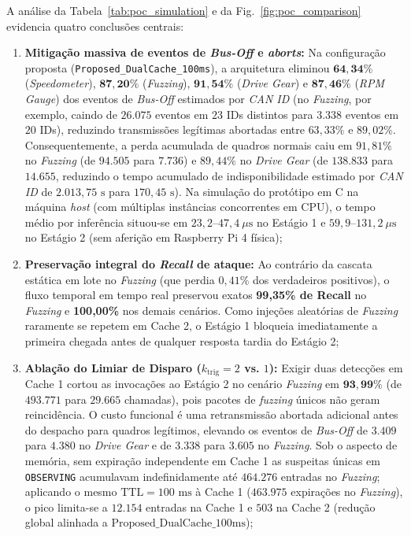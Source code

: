 \documentclass[conference]{IEEEtran}
\begin{document}
A análise da Tabela~\ref{tab:poc_simulation} e da Fig.~\ref{fig:poc_comparison} evidencia quatro conclusões centrais:
\begin{enumerate}
    \item \textbf{Mitigação massiva de eventos de \textit{Bus-Off} e \textit{aborts}:} Na configuração proposta (\texttt{Proposed\_DualCache\_100ms}), a arquitetura eliminou $\mathbf{64{,}34\%}$ (\textit{Speedometer}), $\mathbf{87{,}20\%}$ (\textit{Fuzzing}), $\mathbf{91{,}54\%}$ (\textit{Drive Gear}) e $\mathbf{87{,}46\%}$ (\textit{RPM Gauge}) dos eventos de \textit{Bus-Off} estimados por \textit{CAN ID} (no \textit{Fuzzing}, por exemplo, caindo de $26.075$ eventos em $23$ IDs distintos para $3.338$ eventos em $20$ IDs), reduzindo transmissões legítimas abortadas entre $63{,}33\%$ e $89{,}02\%$. Consequentemente, a perda acumulada de quadros normais caiu em $91{,}81\%$ no \textit{Fuzzing} (de $94.505$ para $7.736$) e $89{,}44\%$ no \textit{Drive Gear} (de $138.833$ para $14.655$, reduzindo o tempo acumulado de indisponibilidade estimado por \textit{CAN ID} de $2.013{,}75\text{ s}$ para $170{,}45\text{ s}$). Na simulação do protótipo em C na máquina \textit{host} (com múltiplas instâncias concorrentes em CPU), o tempo médio por inferência situou-se em $23{,}2\text{--}47{,}4~\mu\text{s}$ no Estágio 1 e $59{,}9\text{--}131{,}2~\mu\text{s}$ no Estágio 2 (sem aferição em Raspberry Pi 4 física);
    \item \textbf{Preservação integral do \textit{Recall} de ataque:} Ao contrário da cascata estática em lote no \textit{Fuzzing} (que perdia $0{,}41\%$ dos verdadeiros positivos), o fluxo temporal em tempo real preservou exatos \textbf{99,35\% de Recall} no \textit{Fuzzing} e \textbf{100,00\%} nos demais cenários. Como injeções aleatórias de \textit{Fuzzing} raramente se repetem em Cache 2, o Estágio 1 bloqueia imediatamente a primeira chegada antes de qualquer resposta tardia do Estágio 2;
    \item \textbf{Ablação do Limiar de Disparo ($k_{\text{trig}}=2$ vs. $1$):} Exigir duas detecções em Cache 1 cortou as invocações ao Estágio 2 no cenário \textit{Fuzzing} em $\mathbf{93{,}99\%}$ (de $493.771$ para $29.665$ chamadas), pois pacotes de \textit{fuzzing} únicos não geram reincidência. O custo funcional é uma retransmissão abortada adicional antes do despacho para quadros legítimos, elevando os eventos de \textit{Bus-Off} de $3.409$ para $4.380$ no \textit{Drive Gear} e de $3.338$ para $3.605$ no \textit{Fuzzing}. Sob o aspecto de memória, sem expiração independente em Cache 1 as suspeitas únicas em \texttt{OBSERVING} acumulavam indefinidamente até $464.276$ entradas no \textit{Fuzzing}; aplicando o mesmo $\text{TTL}=100\text{ ms}$ à Cache 1 ($463.975$ expirações no \textit{Fuzzing}), o pico limita-se a $12.154$ entradas na Cache 1 e $503$ na Cache 2 (redução global alinhada a $\text{Proposed\_DualCache\_100ms}$);

\end{enumerate}
\end{document}
